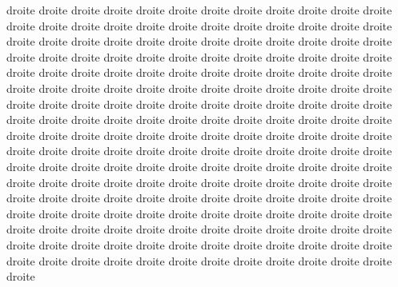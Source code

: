 \documentclass[12pt]{book}
\begin{document}
\begin{pages}
\begin{Rightside}
\beginnumbering
{}
droite droite droite droite droite droite droite droite droite droite droite droite droite droite droite droite droite droite droite droite droite droite droite droite droite droite droite droite droite droite droite droite droite droite droite droite droite droite droite droite droite droite droite droite droite droite droite droite droite droite droite droite droite droite droite droite droite droite droite droite droite droite droite droite droite droite droite droite droite droite droite droite droite droite droite droite droite droite droite droite droite droite
\pend
{}
droite droite droite droite droite droite droite droite droite droite droite droite droite droite droite droite droite droite droite droite droite droite droite droite droite droite droite droite droite droite droite droite droite droite droite droite droite droite droite droite droite droite droite droite droite droite droite droite droite droite droite droite droite droite droite droite droite droite droite droite droite droite droite droite droite droite droite droite droite droite droite droite droite droite droite droite droite droite droite droite droite droite droite droite droite droite droite droite droite droite droite droite droite droite droite droite droite droite droite droite droite droite droite droite droite droite droite droite droite droite droite droite droite droite droite droite droite droite droite droite droite droite droite
\pend
\endnumbering
\end{Rightside}

\end{pages}
\Pages
\end{document}
